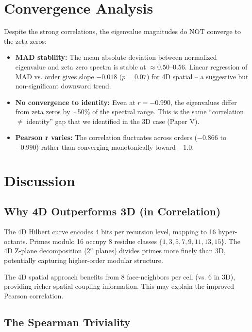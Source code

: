 \documentclass[11pt,a4paper]{article}
\begin{document}
\section{Convergence Analysis}

Despite the strong correlations, the eigenvalue magnitudes do NOT
converge to the zeta zeros:

\begin{itemize}
\item \textbf{MAD stability:} The mean absolute deviation between
   normalized eigenvalue and zeta zero spectra is stable at $\approx
   0.50$--$0.56$.  Linear regression of MAD vs. order gives slope
   $-0.018$ ($p = 0.07$) for 4D spatial -- a suggestive but
   non-significant downward trend.

\item \textbf{No convergence to identity:} Even at $r = -0.990$, the
   eigenvalues differ from zeta zeros by $\sim$50\% of the spectral
   range.  This is the same ``correlation $\neq$ identity'' gap that
   we identified in the 3D case (Paper V).

\item \textbf{Pearson r varies:} The correlation fluctuates across orders
   ($-0.866$ to $-0.990$) rather than converging monotonically toward
   $-1.0$.
\end{itemize}

\section{Discussion}

\subsection{Why 4D Outperforms 3D (in Correlation)}

The 4D Hilbert curve encodes 4 bits per recursion level, mapping to 16
hyper-octants.  Primes modulo 16 occupy 8 residue classes $\{1, 3, 5, 7,
9, 11, 13, 15\}$.  The 4D Z-plane decomposition ($2^n$ planes) divides
primes more finely than 3D, potentially capturing higher-order modular
structure.

The 4D spatial approach benefits from 8 face-neighbors per cell (vs. 6
in 3D), providing richer spatial coupling information.  This may explain
the improved Pearson correlation.

\subsection{The Spearman Triviality}
\end{document}
